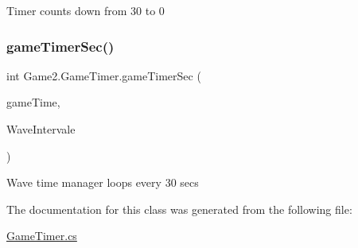 Timer counts down from 30 to 0 \mbox{\label{class_game2_1_1_game_timer_ab343e6dcb30ffa2b96095b805be66b9f}} 
\subsubsection{\texorpdfstring{game\+Timer\+Sec()}{gameTimerSec()}}
{\footnotesize\ttfamily int Game2.\+Game\+Timer.\+game\+Timer\+Sec (\begin{DoxyParamCaption}\item[{Game\+Time}]{game\+Time,  }\item[{int}]{Wave\+Intervale }\end{DoxyParamCaption})}



Wave time manager loops every 30 secs 



The documentation for this class was generated from the following file\+:\begin{DoxyCompactItemize}
\item 
\mbox{\hyperlink{_game_timer_8cs}{Game\+Timer.\+cs}}\end{DoxyCompactItemize}
